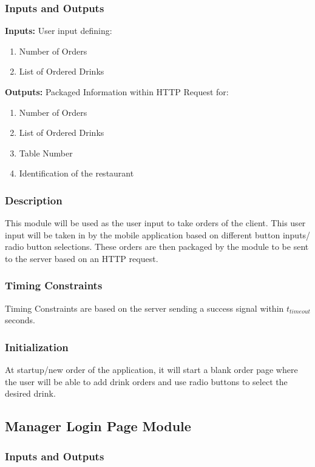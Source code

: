 \documentclass [10pt]{article}
\begin{document}
\subsubsection{Inputs and Outputs}

\textbf{Inputs: } User input defining:
\begin{enumerate}
	\item Number of Orders
	\item List of Ordered Drinks
\end{enumerate}

\textbf{Outputs: } Packaged Information within HTTP Request for:
\begin{enumerate}
	\item Number of Orders
	\item List of Ordered Drinks
	\item Table Number
	\item Identification of the restaurant
\end{enumerate}
\subsubsection{Description}
This module will be used as the user input to take orders of the client. This user input will be taken in by the mobile application based on different button inputs/ radio button selections. These orders are then packaged by the module to be sent to the server based on an HTTP request.

\subsubsection{Timing Constraints}
Timing Constraints are based on the server sending a success signal within $ t_{timeout} $ seconds.

\subsubsection{Initialization}
At startup/new order of the application, it will start a blank order page where the user will be able to add drink orders and use radio buttons to select the desired drink.

\subsection{Manager Login Page Module}

\subsubsection{Inputs and Outputs}
\end{document}
